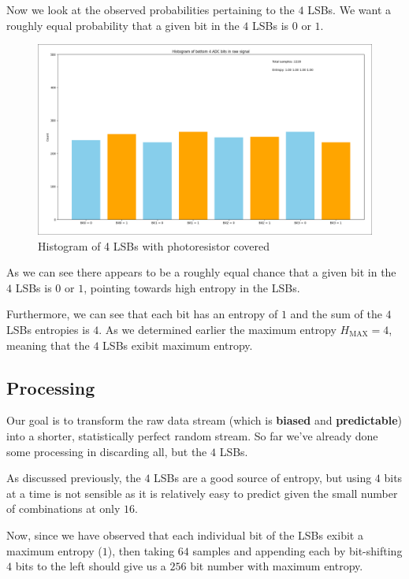 \newpage
Now we look at the observed probabilities pertaining to 
the \(4\) LSBs. We want a roughly equal probability that a given 
bit in the \(4\) LSBs is \(0\) or \(1\).

\begin{figure}[h]
    \centering
    \includegraphics[width=0.9\linewidth]{./images/HISTOGRAM_WITH_ENTROPY.png} 
    \caption{Histogram of 4 LSBs with photoresistor covered}
    \label{fig:histogram_LSB_covered}
\end{figure}

As we can see there appears to be a roughly equal chance that a 
given bit in the \(4\) LSBs is \(0\) or \(1\), pointing towards 
high entropy in the LSBs.

Furthermore, we can see that each bit has an entropy of \(1\)
and the sum of the \(4\) LSBs entropies is \(4\). 
As we determined earlier the maximum entropy \(H_{\text{MAX}} = 4\), 
meaning that the \(4\) LSBs exibit maximum entropy.
 
\subsection{Processing}
Our goal is to transform the raw data stream 
(which is \textbf{biased} and \textbf{predictable}) into a shorter, 
statistically perfect random stream.
So far we've already done some processing in discarding all, but 
the \(4\) LSBs. 

As discussed previously, the \(4\) LSBs are a good source of entropy, 
but using \(4\) bits at a time is not sensible as it 
is relatively easy to predict given the small number of combinations 
at only \(16\).

Now, since we have observed that each individual bit of the 
LSBs exibit a maximum entropy (\(1\)), then taking 
\(64\) samples and appending each by bit-shifting 
\(4\) bits to the left should give us a 
\(256\) bit number with maximum entropy.




